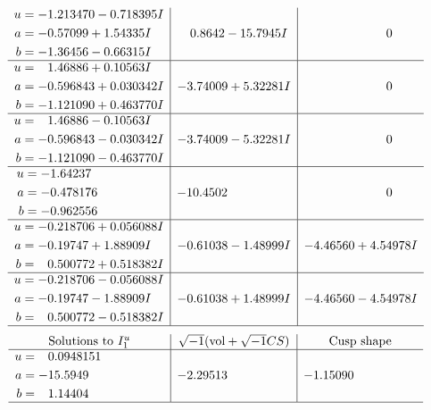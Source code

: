 \documentclass[1p]{elsarticle_modified}
\theoremstyle{definition}
\newcommand{\I}{\sqrt{-1}}
\begin{document}
$$\begin{array}{c|c|c}
\begin{aligned}
u &= -1.213470 - 0.718395 I \\
a &= -0.57099 + 1.54335 I \\
b &= -1.36456 - 0.66315 I\end{aligned}
 & \phantom{-}0.8642 - 15.7945 I & \phantom{-0.000000 } 0 \\ \hline\begin{aligned}
u &= \phantom{-}1.46886 + 0.10563 I \\
a &= -0.596843 + 0.030342 I \\
b &= -1.121090 + 0.463770 I\end{aligned}
 & -3.74009 + 5.32281 I & \phantom{-0.000000 } 0 \\ \hline\begin{aligned}
u &= \phantom{-}1.46886 - 0.10563 I \\
a &= -0.596843 - 0.030342 I \\
b &= -1.121090 - 0.463770 I\end{aligned}
 & -3.74009 - 5.32281 I & \phantom{-0.000000 } 0 \\ \hline\begin{aligned}
u &= -1.64237\phantom{ +0.000000I} \\
a &= -0.478176\phantom{ +0.000000I} \\
b &= -0.962556\phantom{ +0.000000I}\end{aligned}
 & -10.4502\phantom{ +0.000000I} & \phantom{-0.000000 } 0 \\ \hline\begin{aligned}
u &= -0.218706 + 0.056088 I \\
a &= -0.19747 + 1.88909 I \\
b &= \phantom{-}0.500772 + 0.518382 I\end{aligned}
 & -0.61038 - 1.48999 I & -4.46560 + 4.54978 I \\ \hline\begin{aligned}
u &= -0.218706 - 0.056088 I \\
a &= -0.19747 - 1.88909 I \\
b &= \phantom{-}0.500772 - 0.518382 I\end{aligned}
 & -0.61038 + 1.48999 I & -4.46560 - 4.54978 I\\
 \hline 
 \end{array}$$\newpage$$\begin{array}{c|c|c}  
\text{Solutions to }I^u_{1}& \I (\text{vol} + \sqrt{-1}CS) & \text{Cusp shape}\\
 \hline 
\begin{aligned}
u &= \phantom{-}0.0948151\phantom{ +0.000000I} \\
a &= -15.5949\phantom{ +0.000000I} \\
b &= \phantom{-}1.14404\phantom{ +0.000000I}\end{aligned}
 & -2.29513\phantom{ +0.000000I} & -1.15090\phantom{ +0.000000I}\\
 \hline 
 \end{array}$$\newpage\newpage\renewcommand{\arraystretch}{1}
\end{document}
